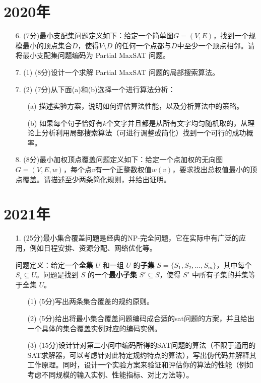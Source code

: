 \documentclass{article}
\begin{document}
\section*{2020年}
\begin{enumerate}
    \item[6. ](7分)最小支配集问题定义如下：给定一个简单图$G=(V,E)$，找到一个规模最小的顶点集合$D$，使得$V \setminus D$ 的任何一个点都与$D$中至少一个顶点相邻。请将最小支配集问题编码为 Partial MaxSAT 问题。
    \vspace{10em}
    \item[7. ](1) (8分)设计一个求解 Partial MaxSAT 问题的局部搜索算法。
    \vspace{10em}
    \item[7. ](2) (7分)从下面(a)和(b)选择一个进行算法分析：
        \begin{enumerate}
            \item[(a)] 描述实验方案，说明如何评估算法性能，以及分析算法中的策略。
            \item[(b)] 如果每个句子恰好有$k$个文字并且都是从所有文字均匀随机取的，从理论上分析利用局部搜索算法（可进行调整或简化）找到一个可行的成功概率。
        \end{enumerate}
    \vspace{10em}
    \item[8. ](8分)最小加权顶点覆盖问题定义如下：给定一个点加权的无向图$G=(V,E,w)$，每个点$v$有一个正整数权值$w(v)$，要求找出总权值最小的顶点覆盖。请描述至少两条简化规则，并给出证明。
\end{enumerate}

\newpage
\section*{2021年}
\begin{enumerate}
    \item[1. ](25分)最小集合覆盖问题是经典的NP-完全问题，它在实际中有广泛的应用，例如日程安排、资源分配、网络优化等。
    
    问题定义：给定一个\textbf{全集} $U$ 和一组 $U$ 的\textbf{子集} $S = \{S_1, S_2, \ldots, S_m\}$，其中每个 $S_i \subseteq U$。问题是找到 $S$ 的一个\textbf{最小子集} $S' \subseteq S$，使得 $S'$ 中所有子集的并集等于全集 $U$。

    \begin{enumerate}
        \item[(1)](5分)写出两条集合覆盖的规约原则。
        \vspace{4em}
        \item[(2)](5分)给出将最小集合覆盖问题编码成合适的sat问题的方案，并且给出一个具体的集合覆盖实例对应的编码实例。
        \vspace{10em}
        \item[(3)](15分)设计针对第二小问中编码所得的SAT问题的算法（不限于通用的SAT求解器，可以考虑针对此特定规约特点的算法），写出伪代码并解释其工作原理。同时，设计一个实验方案来验证和评估你的算法的性能（例如考虑不同规模的输入实例、性能指标、对比方法等）。
    \end{enumerate}
    \vspace{10em}
\end{enumerate}
\end{document}
